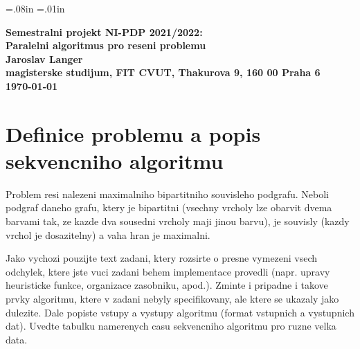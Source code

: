  \oddsidemargin=-5mm
\evensidemargin=-5mm\marginparwidth=.08in \marginparsep=.01in
\marginparpush=5pt\topmargin=-15mm\headheight=12pt
\headsep=25pt\footheight=12pt \footskip=30pt\textheight=25cm
\textwidth=17cm\columnsep=2mm
\columnseprule=1pt\parindent=15pt\parskip=2pt


\begin{center}
\bf Semestralni projekt NI-PDP 2021/2022:\\[5mm]
    Paralelni algoritmus pro reseni problemu\\[5mm]
    Jaroslav Langer\\[2mm]
magisterske studijum, FIT CVUT, Thakurova 9, 160 00 Praha 6\\[2mm]
\today
\end{center}

\section{Definice problemu a popis sekvencniho algoritmu}

Problem resi nalezeni maximalniho bipartitniho souvisleho podgrafu. Neboli
podgraf daneho grafu, ktery je bipartitni (vsechny vrcholy lze obarvit dvema
barvami tak, ze kazde dva sousedni vrcholy maji jinou barvu), je souvisly
(kazdy vrchol je dosazitelny) a vaha hran je maximalni.

%
%


Jako vychozi pouzijte text zadani, ktery rozsirte o presne vymezeni vsech
odchylek, ktere jste vuci zadani behem implementace provedli (napr.  upravy
heuristicke funkce, organizace zasobniku, apod.). Zminte i pripadne i takove
prvky algoritmu, ktere v zadani nebyly specifikovany, ale ktere se ukazaly jako
dulezite.  Dale popiste vstupy a vystupy algoritmu (format vstupnich a
vystupnich dat). Uvedte tabulku namerenych casu sekvencniho algoritmu pro ruzne
velka data.

